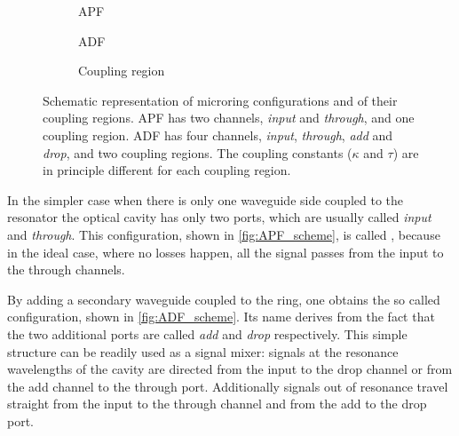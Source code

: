 \begin{figure}[ht]
	\centering
	\begin{subfigure}[b]{0.3\textwidth}
		\centering
		
		\caption{\acs{APF}}
		\label{fig:APF_scheme}
	\end{subfigure}
	\hspace{.02\textwidth}
	\begin{subfigure}[b]{0.3\textwidth}
		\centering
		
		\caption{\acs{ADF}}
		\label{fig:ADF_scheme}
	\end{subfigure}
	\hspace{.02\textwidth}
	\begin{subfigure}[b]{0.3\textwidth}
		\centering
		
		\caption{Coupling region}
		\label{fig:coupling_scheme}
	\end{subfigure}
	
	\caption{
		Schematic representation of microring configurations and of their coupling regions.
		\acs{APF} has two channels, \textit{input} and \textit{through}, and one coupling region.
		\acs{ADF} has four channels, \textit{input}, \textit{through}, \textit{add} and \textit{drop}, and two coupling regions.
		The coupling constants ($\kappa$ and $\tau$) are in principle different for each coupling region.
	}
	\label{fig:resonator_theory}
\end{figure}

In the simpler case when there is only one waveguide side coupled to the resonator the optical cavity has only two ports, which are usually called \textit{input} and \textit{through}.
This configuration, shown in \autoref{fig:APF_scheme}, is called , because in the ideal case, where no losses happen, all the signal passes from the input to the through channels.

By adding a secondary waveguide coupled to the ring, one obtains the so called  configuration, shown in \autoref{fig:ADF_scheme}.
Its name derives from the fact that the two additional ports are called \textit{add} and \textit{drop} respectively.
This simple structure can be readily used as a signal mixer: signals at the resonance wavelengths of the cavity are directed from the input to the drop channel or from the add channel to the through port.
Additionally signals out of resonance travel straight from the input to the through channel and from the add to the drop port.

